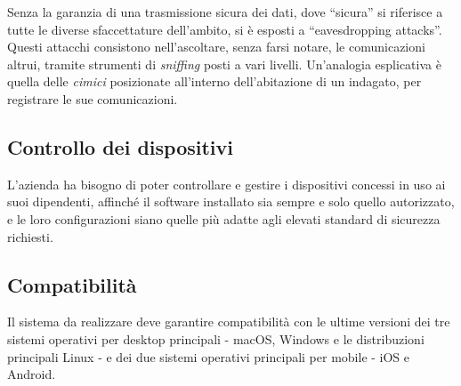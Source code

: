 Senza la garanzia di una trasmissione sicura dei dati, dove ``sicura'' si riferisce a tutte le diverse sfaccettature dell'ambito, si è esposti a ``eavesdropping attacks''. Questi attacchi consistono nell'ascoltare, senza farsi notare, le comunicazioni altrui, tramite strumenti di \emph{sniffing} posti a vari livelli. Un'analogia esplicativa è quella delle \emph{cimici} posizionate all'interno dell'abitazione di un indagato, per registrare le sue comunicazioni.

\subsection{Controllo dei dispositivi}
L'azienda ha bisogno di poter controllare e gestire i dispositivi concessi in uso ai suoi dipendenti, affinché il software installato sia sempre e solo quello autorizzato, e le loro configurazioni siano quelle più adatte agli elevati standard di sicurezza richiesti.

\subsection{Compatibilità}
Il sistema da realizzare deve garantire compatibilità con le ultime versioni dei tre sistemi operativi per desktop principali - macOS, Windows e le distribuzioni principali Linux -  e dei due sistemi operativi principali per mobile - iOS e Android.